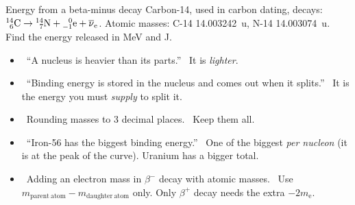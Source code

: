 \begin{workedexample}{Energy from a beta-minus decay}\label{ch4:we:carbon}
Carbon-14, used in carbon dating, decays:
$\chFourNuc{14}{6}{C} \to \chFourNuc{14}{7}{N} + \chFourBeta + \chFourAnu$. Atomic
masses: C-14 \qty{14.003242}{\amu}, N-14 \qty{14.003074}{\amu}. Find the energy
released in MeV and J.
\end{workedexample}

\begin{mistakes}
\begin{itemize}
  \item \xmark\ ``A nucleus is heavier than its parts.'' \cmark\ It is \emph{lighter}.
  \item \xmark\ ``Binding energy is stored in the nucleus and comes out when it
        splits.'' \cmark\ It is the energy you must \emph{supply} to split it.
  \item \xmark\ Rounding masses to 3 decimal places. \cmark\ Keep them all.
  \item \xmark\ ``Iron-56 has the biggest binding energy.'' \cmark\ One of the biggest
        \emph{per nucleon} (it is at the peak of the curve). Uranium has a bigger
        total.
  \item \xmark\ Adding an electron mass in $\beta^-$ decay with atomic masses.
        \cmark\ Use $m_\mathrm{parent\ atom} - m_\mathrm{daughter\ atom}$ only. Only
        $\beta^+$ decay needs the extra $-2m_\mathrm{e}$.
\end{itemize}
\end{mistakes}


